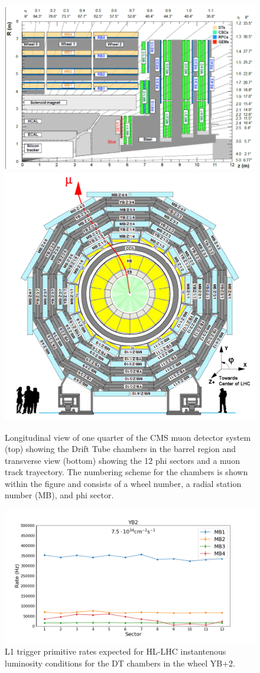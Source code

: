 \begin{figure}[hbtp]
\centering
\includegraphics[width=.8\linewidth]{tex/Part2/fig/DT/DT-longitudinal.png}
\includegraphics[width=.7\linewidth]{tex/Part2/fig/DT/DT-transverse.png}
\caption{
  Longitudinal view of one quarter of the CMS muon detector system (top) showing the Drift Tube chambers in the barrel region
  and transverse view (bottom) showing the 12 phi sectors and a muon track trayectory.
  The numbering scheme for the chambers is shown within the figure and consists of a wheel number, a radial station number (MB), and phi sector.
}
\label{fig:DT_layout}
\end{figure}


\begin{figure}[hbtp]
\centering
\includegraphics[width=.8\linewidth]{tex/Part2/fig/DT/DT-RatesExtrapolated.png}
\caption{L1 trigger primitive rates expected for HL-LHC instantenous luminosity conditions for the DT chambers in the wheel YB+2.} 
\label{fig:DT_rates}
\end{figure}



